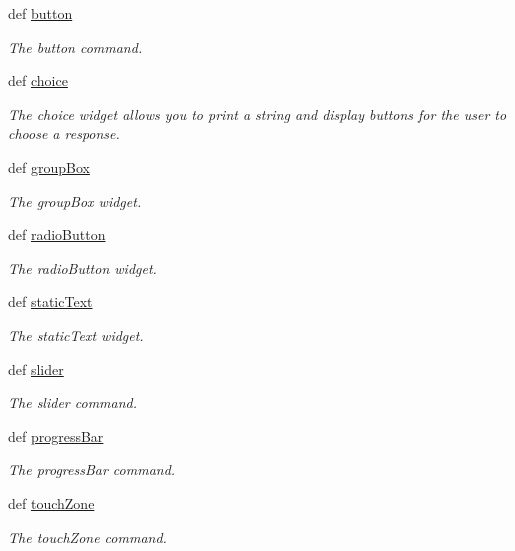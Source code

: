 \begin{DoxyCompactItemize}
def \hyperlink{group___widgets_ga7eeeb3ce522c7891c3f76cdc79f11192}{button}
\begin{DoxyCompactList}\small\item\em The button command. \end{DoxyCompactList}\item 
def \hyperlink{group___widgets_gad1b05a5ee17690c241c30b6a15437c8b}{choice}
\begin{DoxyCompactList}\small\item\em The choice widget allows you to print a string and display buttons for the user to choose a response. \end{DoxyCompactList}\item 
def \hyperlink{group___widgets_ga794dde0f8237dcfcd90646e0eeb2ca65}{group\-Box}
\begin{DoxyCompactList}\small\item\em The group\-Box widget. \end{DoxyCompactList}\item 
def \hyperlink{group___widgets_gaeb3dc4a2ae0923d39259c6583b4ed240}{radio\-Button}
\begin{DoxyCompactList}\small\item\em The radio\-Button widget. \end{DoxyCompactList}\item 
def \hyperlink{group___widgets_ga1f298ec66c48404b6c9deb6bebb0815c}{static\-Text}
\begin{DoxyCompactList}\small\item\em The static\-Text widget. \end{DoxyCompactList}\item 
def \hyperlink{group___widgets_gafce5d2b8d149e7d84a27ca9740baefe3}{slider}
\begin{DoxyCompactList}\small\item\em The slider command. \end{DoxyCompactList}\item 
def \hyperlink{group___widgets_ga1e17ba92ebcd90504fdc0f8fddb84bf0}{progress\-Bar}
\begin{DoxyCompactList}\small\item\em The progress\-Bar command. \end{DoxyCompactList}\item 
def \hyperlink{group___widgets_ga7a2150ae399ca581088ac55f421731cb}{touch\-Zone}
\begin{DoxyCompactList}\small\item\em The touch\-Zone command. \end{DoxyCompactList}\item 

\end{DoxyCompactItemize}
